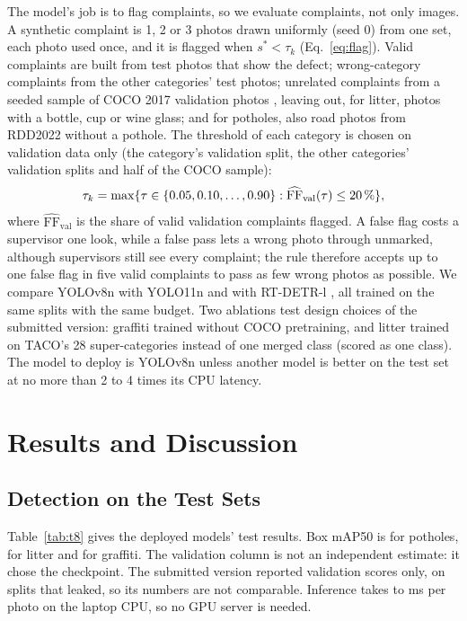 \documentclass{ieeeaccess}
\begin{document}
The model's job is to flag complaints, so we evaluate complaints, not only images. A synthetic complaint is 1, 2 or 3 photos drawn uniformly (seed 0) from one set, each photo used once, and it is flagged when $s^{*}<\tau_k$ (Eq.~\ref{eq:flag}). Valid complaints are built from test photos that show the defect; wrong-category complaints from the other categories' test photos; unrelated complaints from a seeded sample of COCO 2017 validation photos \cite{b55}, leaving out, for litter, photos with a bottle, cup or wine glass; and for potholes, also road photos from RDD2022 without a pothole. The threshold of each category is chosen on validation data only (the category's validation split, the other categories' validation splits and half of the COCO sample):
\begin{equation}
\tau_k=\max\{\tau\in\{0.05,0.10,\dots,0.90\} : \widehat{\mathrm{FF}}_{\mathrm{val}}(\tau)\le20\,\%\},
\label{eq:tau}
\end{equation}
where $\widehat{\mathrm{FF}}_{\mathrm{val}}$ is the share of valid validation complaints flagged. A false flag costs a supervisor one look, while a false pass lets a wrong photo through unmarked, although supervisors still see every complaint; the rule therefore accepts up to one false flag in five valid complaints to pass as few wrong photos as possible. We compare YOLOv8n with YOLO11n \cite{b61} and with RT-DETR-l \cite{b56}, all trained on the same splits with the same budget. Two ablations test design choices of the submitted version: graffiti trained without COCO pretraining, and litter trained on TACO's 28 super-categories instead of one merged class (scored as one class). The model to deploy is YOLOv8n unless another model is better on the test set at no more than 2 to 4 times its CPU latency.

\section{Results and Discussion}\label{sec:res}

\subsection{Detection on the Test Sets}

Table~\ref{tab:t8} gives the deployed models' test results. Box mAP50 is \nPotholeTestMap{} for potholes, \nLitterTestMap{} for litter and \nGraffitiTestMap{} for graffiti. The validation column is not an independent estimate: it chose the checkpoint. The submitted version reported validation scores only, on splits that leaked, so its numbers are not comparable. Inference takes \nCpuMsMin{} to \nCpuMsMax{} ms per photo on the laptop CPU, so no GPU server is needed.
\end{document}
